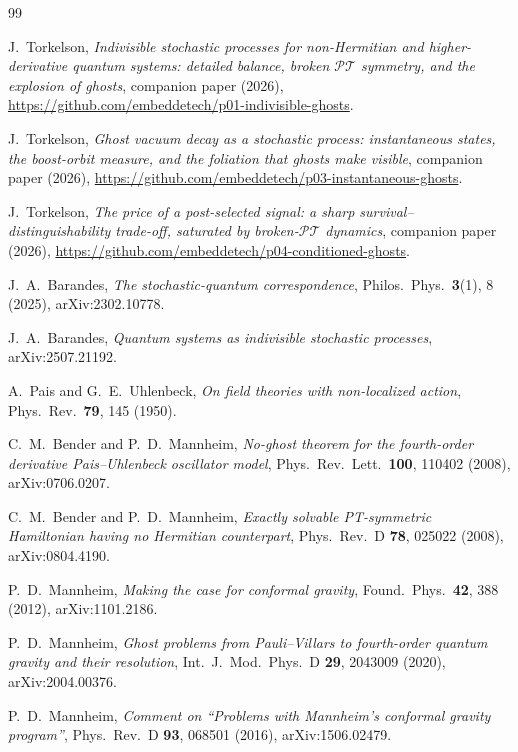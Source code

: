 \documentclass[11pt]{article}
\theoremstyle{definition}
\theoremstyle{remark}
\newcommand{\PT}{\mathcal{PT}}
\begin{document}
\begin{thebibliography}{99}\small

J.~Torkelson,
\emph{Indivisible stochastic processes for non-Hermitian and
higher-derivative quantum systems: detailed balance, broken $\PT$
symmetry, and the explosion of ghosts},
companion paper (2026),
\url{https://github.com/embeddetech/p01-indivisible-ghosts}.

J.~Torkelson,
\emph{Ghost vacuum decay as a stochastic process: instantaneous
states, the boost-orbit measure, and the foliation that ghosts make
visible},
companion paper (2026),
\url{https://github.com/embeddetech/p03-instantaneous-ghosts}.

J.~Torkelson,
\emph{The price of a post-selected signal: a sharp
survival--distinguishability trade-off, saturated by broken-$\PT$
dynamics},
companion paper (2026),
\url{https://github.com/embeddetech/p04-conditioned-ghosts}.

J.~A.~Barandes,
\emph{The stochastic-quantum correspondence},
Philos.\ Phys.\ \textbf{3}(1), 8 (2025), arXiv:2302.10778.

J.~A.~Barandes,
\emph{Quantum systems as indivisible stochastic processes},
arXiv:2507.21192.

A.~Pais and G.~E.~Uhlenbeck,
\emph{On field theories with non-localized action},
Phys.\ Rev.\ \textbf{79}, 145 (1950).

C.~M.~Bender and P.~D.~Mannheim,
\emph{No-ghost theorem for the fourth-order derivative
Pais--Uhlenbeck oscillator model},
Phys.\ Rev.\ Lett.\ \textbf{100}, 110402 (2008), arXiv:0706.0207.

C.~M.~Bender and P.~D.~Mannheim,
\emph{Exactly solvable PT-symmetric Hamiltonian having no Hermitian
counterpart},
Phys.\ Rev.\ D \textbf{78}, 025022 (2008), arXiv:0804.4190.

P.~D.~Mannheim,
\emph{Making the case for conformal gravity},
Found.\ Phys.\ \textbf{42}, 388 (2012), arXiv:1101.2186.

P.~D.~Mannheim,
\emph{Ghost problems from Pauli--Villars to fourth-order quantum
gravity and their resolution},
Int.\ J.\ Mod.\ Phys.\ D \textbf{29}, 2043009 (2020),
arXiv:2004.00376.

P.~D.~Mannheim,
\emph{Comment on ``Problems with Mannheim's conformal gravity
program''},
Phys.\ Rev.\ D \textbf{93}, 068501 (2016), arXiv:1506.02479.


\end{thebibliography}
\end{document}
